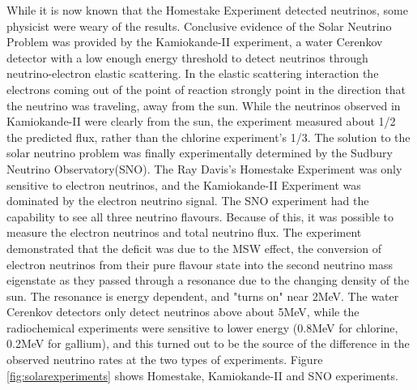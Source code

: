 While it is now known that the Homestake Experiment detected neutrinos, some physicist were weary of the results. Conclusive evidence of the Solar Neutrino Problem was provided by the Kamiokande-II experiment, a water Cerenkov detector with a low enough energy threshold to detect neutrinos through neutrino-electron elastic scattering. In the elastic scattering interaction the electrons coming out of the point of reaction strongly point in the direction that the neutrino was traveling, away from the sun. While the neutrinos observed in Kamiokande-II were clearly from the sun, the experiment measured about 1/2 the predicted flux, rather than the chlorine experiment's 1/3.
The solution to the solar neutrino problem was finally experimentally determined by the Sudbury Neutrino Observatory(SNO). The Ray Davis's Homestake Experiment was only sensitive to electron neutrinos, and the Kamiokande-II Experiment was dominated by the electron neutrino signal. The SNO experiment had the capability to see all three neutrino flavours. Because of this, it was possible to measure the electron neutrinos and total neutrino flux. The experiment demonstrated that the deficit was due to the MSW effect,  the conversion of electron neutrinos from their pure flavour state into the second neutrino mass eigenstate as they passed through a resonance due to the changing density of the sun. The resonance is energy dependent, and "turns on" near 2MeV. The water Cerenkov detectors only detect neutrinos above about 5MeV, while the radiochemical experiments were sensitive to lower energy (0.8MeV for chlorine, 0.2MeV for gallium), and this turned out to be the source of the difference in the observed neutrino rates at the two types of experiments. Figure \ref{fig:solarexperiments} shows Homestake, Kamiokande-II and SNO experiments. 
